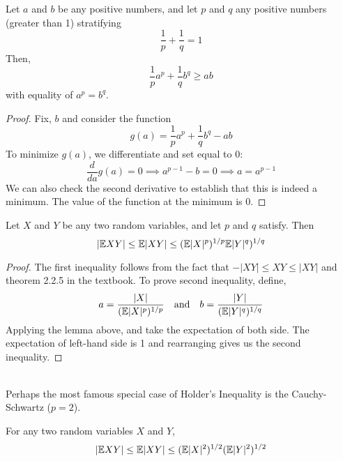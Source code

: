 \begin{lemma}
    Let $a$ and $b$ be any positive numbers, and let $p$ and $q$ any positive numbers (greater than 1) stratifying
    $$
    \frac{1}{p} + \frac{1}{q} = 1
    $$
    Then, 
    $$
    \frac{1}{p} a^p + \frac{1}{q} b^q \geq ab
    $$
    with equality of $a^p = b^q$.
\end{lemma}
\begin{proof}
    Fix, $b$ and consider the function 
    $$
    g(a) = \frac{1}{p} a^p + \frac{1}{q} b^q -ab
    $$
    To minimize $g(a)$, we differentiate and set equal to 0:
    $$
    \frac{d}{da}g(a) = 0 \implies a^{p-1} -b = 0 \implies a = a^{p-1} 
    $$
    We can also check the second derivative to establish that this is indeed a minimum. The value of the function at the minimum is 0. 
\end{proof}
\begin{theorem}
    Let $X$ and $Y$ be any two random variables, and let $p$ and $q$ satisfy. Then
    $$
    |\mathbb E XY| \leq \mathbb E|XY| \leq (\mathbb E |X|^p)^{1/p}\mathbb E |Y|^q)^{1/q}
    $$
\end{theorem}
\begin{proof}
    The first inequality follows from the fact that $-|XY| \leq XY \leq |XY|$ and theorem 2.2.5 in the textbook. To prove second inequality, define,
    $$
    a = \frac{|X|}{(\mathbb E|X|^p)^{1/p}} \quad \text{and} \quad
    b = \frac{|Y|}{(\mathbb E|Y|^q)^{1/q}}
    $$
    Applying the lemma above, and take the expectation of both side. The expectation of left-hand side is 1 and rearranging gives us the second inequality.
\end{proof}
\\
Perhaps the most famous special case of Holder's Inequality is the Cauchy-Schwartz ($p=2$).

\begin{theorem}
    For any two random variables $X$ and $Y$,
    $$|\mathbb E XY| \leq \mathbb E |XY| \leq (\mathbb E|X|^2)^{1/2} (\mathbb E|Y|^2)^{1/2} 
    $$
\end{theorem}